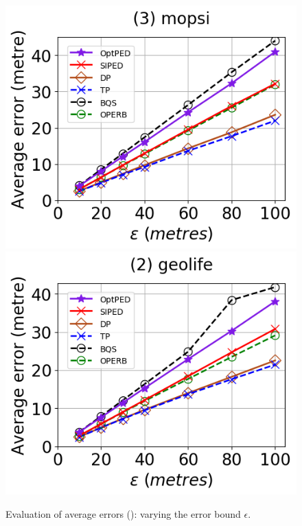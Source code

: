 \begin{figure}[tb!]
	\includegraphics[scale=0.315]{Figures/Exp-PED-error-epsilon-mopsi.png}	\hspace{1ex}
	\includegraphics[scale=0.315]{Figures/Exp-PED-error-epsilon-geolife.png} 
	\vspace{-2.5ex}
	\caption{\small Evaluation of average errors (\ped): varying the error bound $\epsilon$.}
	\label{fig:ae-ped}
	\vspace{-2ex}
\end{figure}

